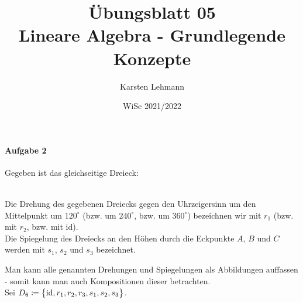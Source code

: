 \documentclass{scrreprt}
\author{Karsten Lehmann}
\date{WiSe 2021/2022}
\title{Übungsblatt 05\\Lineare Algebra - Grundlegende Konzepte}
\begin{document}
\paragraph{Aufgabe 2} Gegeben ist das gleichseitige Dreieck:

 \\
Die Drehung des gegebenen Dreiecks gegen den Uhrzeigersinn um den Mittelpunkt
um $120^{\circ}$ (bzw. um $240^{\circ}$, bzw. um $360^{\circ}$) bezeichnen wir
mit $r_1$ (bzw. mit $r_2$, bzw. mit id). \\
Die Spiegelung des Dreiecks an den Höhen durch die Eckpunkte $A$, $B$ und $C$
werden mit $s_1$, $s_2$ und $s_3$ bezeichnet.

Man kann alle genannten Drehungen und Spiegelungen als Abbildungen auffassen -
somit kann man auch Kompositionen dieser betrachten. \\
Sei $D_6 \coloneqq \qty\big{\text{id}, r_1, r_2, r_3, s_1, s_2, s_3}$.
\end{document}
